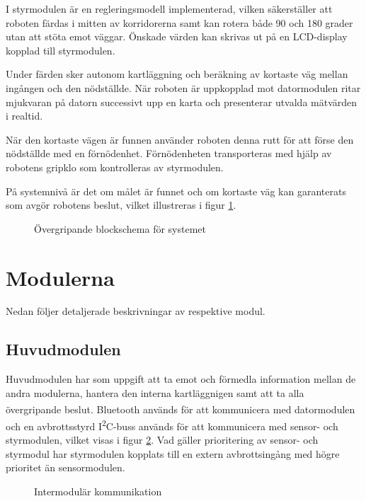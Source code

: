 \documentclass[11pt]{article}
\begin{document}
\begin{flushleft}
I styrmodulen är en regleringsmodell implementerad, vilken säkerställer att roboten färdas i mitten av korridorerna samt kan rotera både 90 och 180 grader utan att stöta emot väggar. Önskade värden kan skrivas ut på en LCD-display kopplad till styrmodulen.

Under färden sker autonom kartläggning och beräkning av kortaste väg mellan ingången och den nödställde. När roboten är uppkopplad mot datormodulen ritar mjukvaran på datorn successivt upp en karta och presenterar utvalda mätvärden i realtid. 

När den kortaste vägen är funnen använder roboten denna rutt för att förse den nödställde med en förnödenhet. Förnödenheten transporteras med hjälp av robotens gripklo som kontrolleras av styrmodulen.

På systemnivå är det om målet är funnet och om kortaste väg kan garanterats som avgör robotens beslut, vilket illustreras i figur \ref{blockSystem}.

\begin{figure}[htbp]
\centering
\noindent\resizebox{1\linewidth}{!}{
	}
	\caption{Övergripande blockschema för systemet}	\label{blockSystem}
\end{figure}

\pagebreak
\section{Modulerna}
Nedan följer detaljerade beskrivningar av respektive modul.

\subsection{Huvudmodulen}
Huvudmodulen har som uppgift att ta emot och förmedla information mellan de andra modulerna, hantera den interna kartläggnigen samt att ta alla övergripande beslut. Bluetooth\textsuperscript{\circledR} används för att kommunicera med datormodulen och en avbrottsstyrd I\textsuperscript{2}C-buss används för att kommunicera med sensor- och styrmodulen, vilket visas i figur \ref{communication}. Vad gäller prioritering av sensor- och styrmodul har styrmodulen kopplats till en extern avbrottsingång med högre prioritet än sensormodulen.

\begin{figure}[htbp]
\noindent\resizebox{.97\textwidth}{!}{
}
\caption{Intermodulär kommunikation \label{communication}}
\end{figure}


\end{flushleft}
\end{document}
